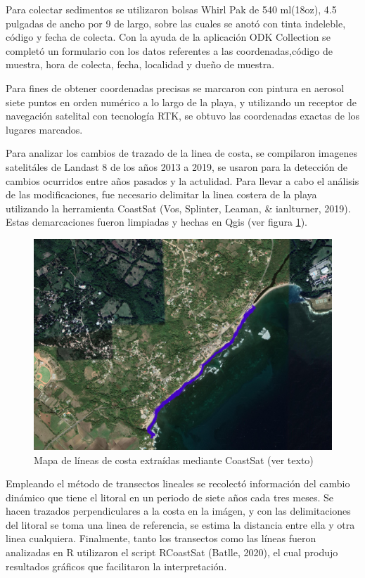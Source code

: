 \documentclass[11pt,]{article}
\begin{document}
Para colectar sedimentos se utilizaron bolsas Whirl Pak de 540 ml(18oz),
4.5 pulgadas de ancho por 9 de largo, sobre las cuales se anotó con
tinta indeleble, código y fecha de colecta. Con la ayuda de la
aplicación ODK Collection se completó un formulario con los datos
referentes a las coordenadas,código de muestra, hora de colecta, fecha,
localidad y dueño de muestra.

Para fines de obtener coordenadas precisas se marcaron con pintura en
aerosol siete puntos en orden numérico a lo largo de la playa, y
utilizando un receptor de navegación satelital con tecnología RTK, se
obtuvo las coordenadas exactas de los lugares marcados.

Para analizar los cambios de trazado de la linea de costa, se compilaron
imagenes satelitáles de Landast 8 de los años 2013 a 2019, se usaron
para la detección de cambios ocurridos entre años pasados y la
actulidad. Para llevar a cabo el análisis de las modificaciones, fue
necesario delimitar la linea costera de la playa utilizando la
herramienta CoastSat (Vos, Splinter, Leaman, \& ianlturner, 2019). Estas
demarcaciones fueron limpiadas y hechas en Qgis (ver figura
\ref{lineas_najayo}).

\begin{figure}
\centering
\includegraphics[height=3.12500in]{lineas_najayo.jpg}
\caption{Mapa de líneas de costa extraídas mediante CoastSat (ver texto)
\label{lineas_najayo}}
\end{figure}

Empleando el método de transectos lineales se recolectó información del
cambio dinámico que tiene el litoral en un periodo de siete años cada
tres meses. Se hacen trazados perpendiculares a la costa en la imágen, y
con las delimitaciones del litoral se toma una linea de referencia, se
estima la distancia entre ella y otra linea cualquiera. Finalmente,
tanto los transectos como las líneas fueron analizadas en R utilizaron
el script RCoastSat (Batlle, 2020), el cual produjo resultados gráficos
que facilitaron la interpretación.
\end{document}
